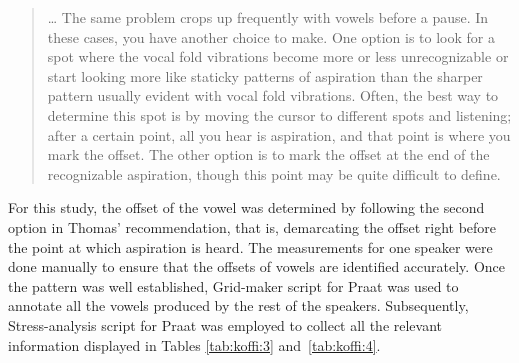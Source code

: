 \documentclass[output=paper,
modfonts
]{langscibook}
\begin{document}
\begin{quote}
… The same problem crops up frequently with vowels before a pause. In these cases, you have another choice to make. One option is to look for a spot where the vocal fold vibrations become more or less unrecognizable or start looking more like staticky patterns of aspiration than the sharper pattern usually evident with vocal fold vibrations. Often, the best way to determine this spot is by moving the cursor to different spots and listening; after a certain point, all you hear is aspiration, and that point is where you mark the offset. The other option is to mark the offset at the end of the recognizable aspiration, though this point may be quite difficult to define.
\end{quote}

For this study, the offset of the vowel was determined by following the second option in Thomas’ recommendation, that is, demarcating the offset right before the point at which aspiration is heard. The measurements for one speaker were done manually to ensure that the offsets of vowels are identified accurately. Once the pattern was well established,  Grid-maker script for Praat was used to annotate all the vowels produced by the rest of the speakers. Subsequently,  Stress-analysis script for Praat was employed to collect all the relevant information displayed in Tables \ref{tab:koffi:3} and~\ref{tab:koffi:4}. 
\end{document}
